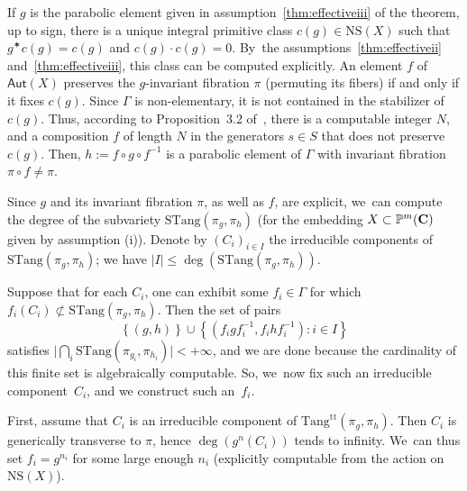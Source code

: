 \documentclass[11pt]{article}
\let\sep :
\newcommand{\set}[1]{\left\{#1\right\}}
\newcommand{\inv}{^{-1}}
\def\C{\mathbf{C}}
\newcommand{\NS}{{\mathrm{NS}}}
\newcommand{\Tang}{{\mathrm{Tang}}}
\newcommand{\STang}{{\mathrm{STang}}}
\newcommand\Aut{\mathsf{Aut}}
\theoremstyle{plain}
\theoremstyle{definition}
\numberwithin{equation}{section}
\begin{document}
If $g$ is the parabolic element given in assumption~\eqref{thm:effectiveiii} of the theorem, up to sign, there is a unique integral primitive class $c(g)\in \NS(X)$ such that $g^\varstar c(g)=c(g)$ and $c(g)\cdot c(g)=0$. By~the assumptions~\eqref{thm:effectiveii} and~\eqref{thm:effectiveiii}, this class can be computed explicitly. An element $f$ of $\Aut(X)$ preserves the $g$-invariant fibration $\pi$ (permuting its fibers) if and only if it fixes $c(g)$. Since $\Gamma$ is non-elementary, it is not contained in the stabilizer of $c(g)$. Thus, according to Proposition~3.2 of~\cite{eskin-mozes-oh}, there is a computable integer $N$, and a composition $f$ of length $N$ in the generators $s\in S$ that does not preserve $c(g)$. Then, $h:= f\circ g \circ f^{-1}$ is a parabolic element of $\Gamma$ with invariant fibration $\pi\circ f\neq \pi$.

Since $g$ and its invariant fibration $\pi$, as well as $f$, are explicit, we~can compute the degree of the subvariety
$\STang(\pi_g, \pi_h)$ (for the embedding $X\subset \P^m(\C)$ given by assumption (i)). Denote by $(C_i)_{i\in I}$ the irreducible components of $\STang(\pi_g, \pi_h)$; we have $\vert I\vert \leq \deg(\STang(\pi_g, \pi_h))$.

Suppose that for each $C_i$, one can exhibit some $f_i\in \Gamma$ for which $f_i(C_i)\not \subset \STang(\pi_g, \pi_h)$. Then the set of pairs
\begin{equation*}
\set{(g,h)} \cup \set{ (f_igf_i\inv, f_i h f_i\inv)\sep  i\in I}
\end{equation*}
satisfies $\vert \bigcap_i\STang(\pi_{g_i}, \pi_{h_i})\vert < +\infty$, and we are done because the cardinality of this finite set is algebraically computable.
So, we~now fix such an irreducible component~$C_i$, and we construct such an~$f_i$.

First, assume that $C_i$ is an irreducible component of $\Tang^{\mathrm{tt}}(\pi_g, \pi_h)$. Then $C_i$ is generically transverse to $\pi$, hence $\deg(g^n(C_i))$ tends to infinity. We~can thus set \hbox{$f_i=g^{n_i}$} for some large enough $n_i$ (explicitly computable from the action on $\NS(X)$).
\end{document}
